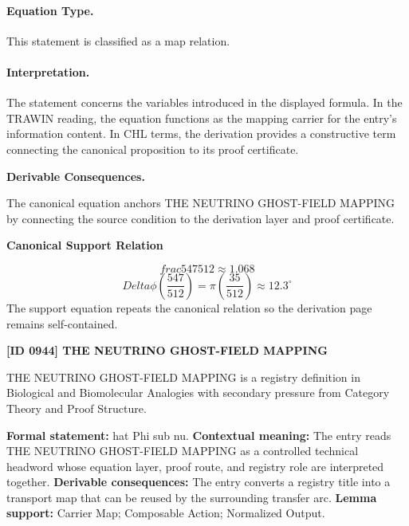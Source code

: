 \paragraph{Equation Type.}
This statement is classified as a map relation.

\paragraph{Interpretation.}
The statement concerns the variables introduced in the displayed formula. In the TRAWIN reading, the equation functions as the mapping carrier for the entry’s information content. In CHL terms, the derivation provides a constructive term connecting the canonical proposition to its proof certificate.

\par\vspace{0.35em}
\noindent\textbf{Derivable Consequences.}\quad
\begingroup
\footnotesize
\raggedright
The canonical equation anchors THE NEUTRINO GHOST-FIELD MAPPING by connecting the source condition to the derivation layer and proof certificate.
\par\endgroup

\noindent\textbf{Canonical Support Relation}\par
\[
frac{547}{512} \approx 1.068
\]
\[
Delta\phi\left(\frac{547}{512}\right) = \pi\left(\frac{35}{512}\right) \approx 12.3^\circ
\]
\noindent The support equation repeats the canonical relation so the derivation page remains self-contained.\par

\clearpage
\noindent\textbf{[ID 0944] THE NEUTRINO GHOST-FIELD MAPPING}\par
\vspace{0.35em}
\begingroup\small
{}
THE NEUTRINO GHOST-FIELD MAPPING is a registry definition in Biological and Biomolecular Analogies with secondary pressure from Category Theory and Proof Structure.

\begingroup\footnotesize\setlength{\emergencystretch}{3em}\sloppy
\textbf{Formal statement:} hat Phi sub nu. \textbf{Contextual meaning:} The entry reads THE NEUTRINO GHOST-FIELD MAPPING as a controlled technical headword whose equation layer, proof route, and registry role are interpreted together. \textbf{Derivable consequences:} The entry converts a registry title into a transport map that can be reused by the surrounding transfer arc. \textbf{Lemma support:} Carrier Map; Composable Action; Normalized Output.\par
\endgroup

